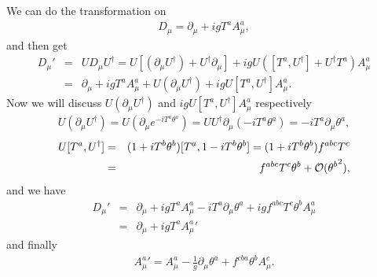 \documentclass[11pt]{article}
\def\del{{\partial}}
\begin{document}
\section{ }
We can do the transformation on
\begin{eqnarray}
    D_\mu = \del_\mu + ig T^a A^a_\mu,
\end{eqnarray}
and then get
\begin{eqnarray}
   D_\mu'&=& U D_\mu U^\dagger = U[(\del_\mu U^\dagger)+U^\dagger \del_\mu ] + ig U ([T^a, U^\dagger]+ U^\dagger T^a) A^a_\mu \\
    &=& \del_\mu + ig T^a A^a_\mu + U(\del_\mu U^\dagger)  + ig U [T^a, U^\dagger] A^a_\mu.
\end{eqnarray}
Now we will discuss $U(\del_\mu U^\dagger)$ and $ig U [T^a, U^\dagger] A^a_\mu$ respectively
\begin{eqnarray}
    U(\del_\mu U^\dagger) = U (\del_\mu e^{-i T^a \theta^a}) = U U^\dagger \del_\mu (-i T^a \theta^a) = -i T^a \del_\mu \theta^a,
\end{eqnarray}
\begin{eqnarray}
    U [T^a, U^\dagger] &=& (1+ i T^b \theta^b ) [T^a, 1-iT^b \theta^b] = (1+ i T^b \theta^b ) f^{abc} T^c\\
    &=& f^{abc} T^c \theta^b + {\cal O} ({\theta^b}^2),
\end{eqnarray}
and we have
\begin{eqnarray}
    D_\mu'&=& \del_\mu + ig T^a A^a_\mu -i T^a \del_\mu \theta^a + i g f^{abc} T^c \theta^b A^a_\mu \\
    &=& \del_\mu + ig T^a {A^a_\mu}' 
\end{eqnarray}
and finally
\begin{eqnarray}
    {A^a_\mu}'= A_\mu^a-\frac{1}{g} \del_\mu \theta^a + f^{cba}\theta^b A^c_\mu.
\end{eqnarray}
\end{document}
